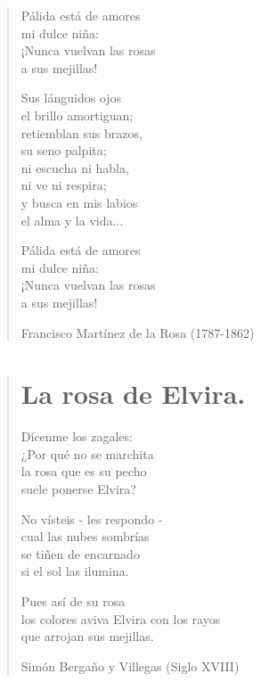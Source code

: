 \documentclass[12pt, twoside]{book}
\begin{document}
\begin{verse}
Pálida está de amores\\
mi dulce niña:\\
¡Nunca vuelvan las rosas\\
a sus mejillas!
\newline

Sus lánguidos ojos\\
el brillo amortiguan;\\
retiemblan sus brazos,\\
su seno palpita;\\
ni escucha ni habla,\\
ni ve ni respira;\\
y busca en mis labios\\
el alma y la vida...
\newline

Pálida está de amores\\
mi dulce niña:\\
¡Nunca vuelvan las rosas\\
a sus mejillas!
\newline

Francisco Martínez de la Rosa (1787-1862)
\end{verse}
\newpage

\begin{verse}
\begin{center}
\section{La rosa de Elvira.}
\end{center}
Dícenme los zagales:\\
¿Por qué no se marchita\\
la rosa que es su pecho\\
suele ponerse Elvira?
\newline

No vísteis - les respondo -\\
cual las nubes sombrías\\
se tiñen de encarnado\\
si el sol las ilumina.
\newline

Pues así de su rosa\\
los colores aviva
Elvira con los rayos\\
que arrojan sus mejillas.
\newline

Simón Bergaño y Villegas (Siglo XVIII)
\end{verse}
\end{document}
